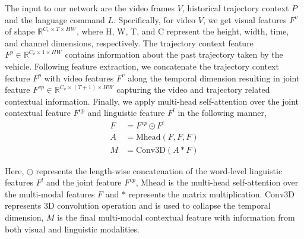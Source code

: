\documentclass[11pt]{article}
\begin{document}
The input to our network are the video frames $V$, historical trajectory context $P$ and the language command $L$. Specifically, for video $V$, we get visual features $F^v$ of shape $ \mathbb R^{C_v \times T \times HW}$, where H, W, T, and C represent the height, width, time, and channel dimensions, respectively. The trajectory context feature $F^p \in \mathbb R^{C_v \times 1 \times HW}$ contains information about the past trajectory taken by the vehicle. Following feature extraction, we concatenate the trajectory context feature $F^p$ with video features $F^v$ along the temporal dimension resulting in joint feature $F^{vp} \in \mathbb R^{C_v \times (T+1) \times HW}$ capturing the video and trajectory related contextual information. Finally, we apply multi-head self-attention over the joint contextual feature $F^{vp}$ and linguistic feature $F^l$ in the following manner,
\begin{equation} \label{eq1}
\begin{split}
    F &= F^{vp} \odot F^l \\
    A &= \text{Mhead}(F, F, F)\\
    M &= \text{Conv3D}(A \ast F)
\end{split}
\end{equation}

Here, $\odot$ represents the length-wise concatenation of the word-level linguistic features $F^l$ and the joint feature $F^{vp}$, $\text{Mhead}$ is the multi-head self-attention over the multi-modal features $F$ and $\ast$ represents the matrix multiplication. $\text{Conv3D}$ represents 3D convolution operation and is used to collapse the temporal dimension, $M$ is the final multi-modal contextual feature with information from both visual and linguistic modalities.
\end{document}
